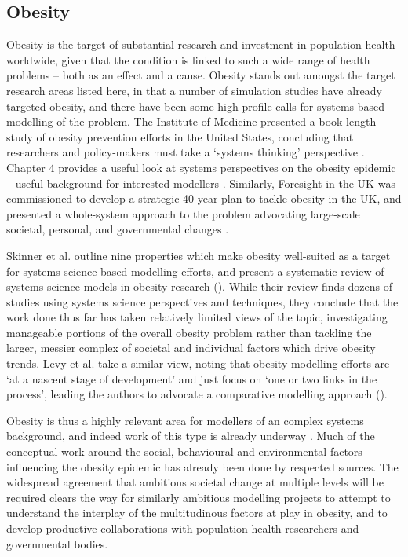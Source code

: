 \documentclass[review]{elsarticle}
\begin{document}
\subsection{Obesity}

Obesity is the target of substantial research and investment in population health worldwide, given that the condition is linked to such a wide range of health problems -- both as an effect and a cause.  Obesity stands out amongst the target research areas listed here, in that a number of simulation studies have already targeted obesity, and there have been some high-profile calls for systems-based modelling of the problem.  The Institute of Medicine presented a book-length study of obesity prevention efforts in the United States, concluding that researchers and policy-makers must take a `systems thinking' perspective \citep{IOM2010}.  Chapter 4 provides a useful look at systems perspectives on the obesity epidemic -- useful background for interested modellers \citep{IOM2010}.  Similarly, Foresight in the UK was commissioned to develop a strategic 40-year plan to tackle obesity in the UK, and presented a whole-system approach to the problem advocating large-scale societal, personal, and governmental changes \citep{Foresight2007}.

Skinner et al. outline nine properties which make obesity well-suited as a target for systems-science-based modelling efforts, and present a systematic review of systems science models in obesity research (\citep{skinner2013}).   While their review finds dozens of studies using systems science perspectives and techniques, they conclude that the work done thus far has taken relatively limited views of the topic, investigating manageable portions of the overall obesity problem rather than tackling the larger, messier complex of societal and individual factors which drive obesity trends.  Levy et al. take a similar view, noting that obesity modelling efforts are `at a nascent stage of development' and just focus on `one or two links in the process', leading the authors to advocate a comparative modelling approach (\citep[][p. 390]{levy2011}). 

Obesity is thus a highly relevant area for modellers of an complex systems background, and indeed work of this type is already underway \citep{silverman2017}.  Much of the conceptual work around the social, behavioural and environmental factors influencing the obesity epidemic has already been done by respected sources.  The widespread agreement that ambitious societal change at multiple levels will be required clears the way for similarly ambitious modelling projects to attempt to understand the interplay of the multitudinous factors at play in obesity, and to develop productive collaborations with population health researchers and governmental bodies.
\end{document}

